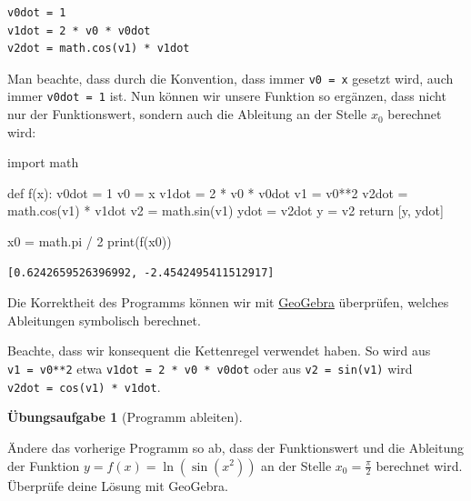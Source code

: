 \documentclass[
  letterpaper,
  DIV=11,
  oneside]{scrreprt}
\newenvironment{Shaded}{\begin{snugshade}}{\end{snugshade}}
\newcommand{\BuiltInTok}[1]{\textcolor[rgb]{0.00,0.23,0.31}{#1}}
\newcommand{\ControlFlowTok}[1]{\textcolor[rgb]{0.00,0.23,0.31}{#1}}
\newcommand{\DecValTok}[1]{\textcolor[rgb]{0.68,0.00,0.00}{#1}}
\newcommand{\ImportTok}[1]{\textcolor[rgb]{0.00,0.46,0.62}{#1}}
\newcommand{\KeywordTok}[1]{\textcolor[rgb]{0.00,0.23,0.31}{#1}}
\newcommand{\NormalTok}[1]{\textcolor[rgb]{0.00,0.23,0.31}{#1}}
\newcommand{\OperatorTok}[1]{\textcolor[rgb]{0.37,0.37,0.37}{#1}}
\theoremstyle{definition}
\newtheorem{exercise}{Übungsaufgabe}[chapter]
\theoremstyle{definition}
\theoremstyle{remark}
\begin{document}
\begin{verbatim}
v0dot = 1
v1dot = 2 * v0 * v0dot
v2dot = math.cos(v1) * v1dot
\end{verbatim}

Man beachte, dass durch die Konvention, dass immer \texttt{v0\ =\ x}
gesetzt wird, auch immer \texttt{v0dot\ =\ 1} ist. Nun können wir unsere
Funktion so ergänzen, dass nicht nur der Funktionswert, sondern auch die
Ableitung an der Stelle \(x_0\) berechnet wird:

\begin{Shaded}
\begin{Highlighting}[]
\ImportTok{import}\NormalTok{ math}

\KeywordTok{def}\NormalTok{ f(x):}
\NormalTok{    v0dot }\OperatorTok{=} \DecValTok{1}
\NormalTok{    v0 }\OperatorTok{=}\NormalTok{ x}
\NormalTok{    v1dot }\OperatorTok{=} \DecValTok{2} \OperatorTok{*}\NormalTok{ v0 }\OperatorTok{*}\NormalTok{ v0dot}
\NormalTok{    v1 }\OperatorTok{=}\NormalTok{ v0}\OperatorTok{**}\DecValTok{2}
\NormalTok{    v2dot }\OperatorTok{=}\NormalTok{ math.cos(v1) }\OperatorTok{*}\NormalTok{ v1dot}
\NormalTok{    v2 }\OperatorTok{=}\NormalTok{ math.sin(v1)}
\NormalTok{    ydot }\OperatorTok{=}\NormalTok{ v2dot}
\NormalTok{    y }\OperatorTok{=}\NormalTok{ v2}
    \ControlFlowTok{return}\NormalTok{ [y, ydot]}

\NormalTok{x0 }\OperatorTok{=}\NormalTok{ math.pi }\OperatorTok{/} \DecValTok{2}
\BuiltInTok{print}\NormalTok{(f(x0))}
\end{Highlighting}
\end{Shaded}

\begin{verbatim}
[0.6242659526396992, -2.4542495411512917]
\end{verbatim}

Die Korrektheit des Programms können wir mit
\href{https://www.geogebra.org/m/u4rkpzsr}{GeoGebra} überprüfen, welches
Ableitungen symbolisch berechnet.

Beachte, dass wir konsequent die Kettenregel verwendet haben. So wird
aus \texttt{v1\ =\ v0**2} etwa \texttt{v1dot\ =\ 2\ *\ v0\ *\ v0dot}
oder aus \texttt{v2\ =\ sin(v1)} wird
\texttt{v2dot\ =\ cos(v1)\ *\ v1dot}.

\leavevmode{}%
\begin{exercise}[Programm ableiten]\label{exr-ErstesADBspErweitern}

Ändere das vorherige Programm so ab, dass der Funktionswert und die
Ableitung der Funktion \(y = f(x) = \ln(\sin(x^2))\) an der Stelle
\(x_0 = \frac{\pi}{2}\) berechnet wird. Überprüfe deine Lösung mit
GeoGebra.

\end{exercise}
\end{document}
